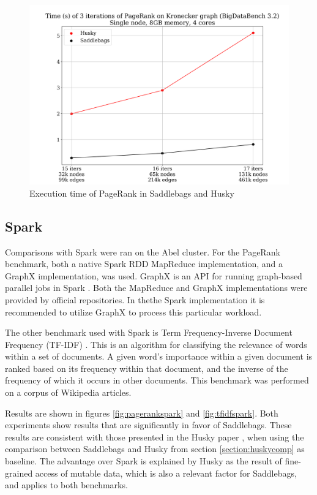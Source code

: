 \documentclass{uit-report}
\begin{document}
\vskip 2cm

\begin{figure}[H]
	\centering
	\includegraphics[width=15cm]{illustrations/png/huskypagerank.png}
	\caption{Execution time of PageRank in Saddlebags and Husky}
	\label{fig:huskypagerank}
\end{figure}



\newpage
\subsection{Spark}\label{section:sparkeval}
Comparisons with Spark were ran on the Abel cluster. For the PageRank benchmark, both a native Spark RDD MapReduce implementation, and a GraphX implementation, was used. GraphX is an API for running graph-based parallel jobs in Spark \cite{graphx}. Both the MapReduce \cite{sparkpagerank} and GraphX \cite{graphxpagerank} implementations were provided by official repositories. In thethe Spark implementation it is recommended to utilize GraphX to process this particular workload.

The other benchmark used with Spark is Term Frequency-Inverse Document Frequency (TF-IDF) \cite{tfidf}. This is an algorithm for classifying the relevance of words within a set of documents. A given word's importance within a given document is ranked based on its frequency within that document, and the inverse of the frequency of which it occurs in other documents. This benchmark was performed on a corpus of Wikipedia articles.

Results are shown in figures \ref{fig:pagerankspark} and \ref{fig:tfidfspark}. Both experiments show results that are significantly in favor of Saddlebags. These results are consistent with those presented in the Husky paper \cite{husky}, when using the comparison between Saddlebags and Husky from section \ref{section:huskycomp} as baseline. The advantage over Spark is explained by Husky as the result of fine-grained access of mutable data, which is also a relevant factor for Saddlebags, and applies to both benchmarks.
\end{document}
